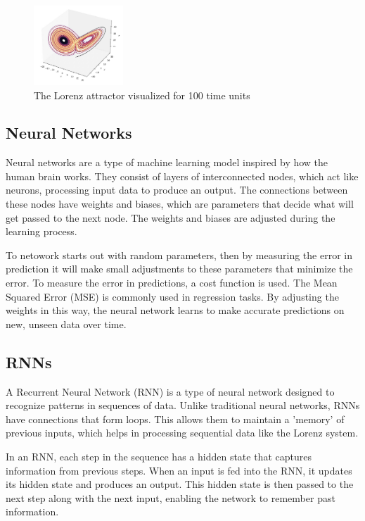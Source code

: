 \documentclass[11pt]{article}
\begin{document}
\begin{figure}[h]

\centering
\includegraphics[width=0.3\textwidth]{lorenz_attractor.jpeg}
\caption{The Lorenz attractor visualized for 100 time units}
\label{fig:lorenz_attractor}
\end{figure}

\subsection{Neural Networks}

Neural networks are a type of machine learning model inspired by how the human brain works. They consist of layers of interconnected nodes, which act like neurons, processing input data to produce an output. The connections between these nodes have weights and biases, which are parameters that decide what will get passed to the next node. The weights and biases are adjusted during the learning process.

To netowork starts out with random parameters, then by measuring the error in prediction it will make small adjustments to these parameters that minimize the error. To measure the error in predictions, a cost function is used. The Mean Squared Error (MSE) is commonly used in regression tasks. By adjusting the weights in this way, the neural network learns to make accurate predictions on new, unseen data over time.


\subsection{RNNs}

A Recurrent Neural Network (RNN) is a type of neural network designed to recognize patterns in sequences of data. Unlike traditional neural networks, RNNs have connections that form loops. This allows them to maintain a 'memory' of previous inputs, which helps in processing sequential data like the Lorenz system.

In an RNN, each step in the sequence has a hidden state that captures information from previous steps. When an input is fed into the RNN, it updates its hidden state and produces an output. This hidden state is then passed to the next step along with the next input, enabling the network to remember past information.
\end{document}
